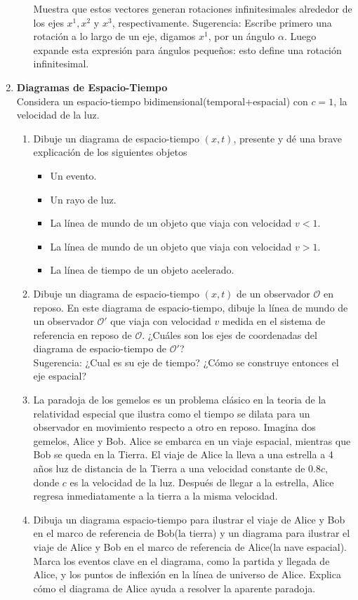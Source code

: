\documentclass[../main]{subfiles}
\begin{document}
\begin{enumerate}
\begin{enumerate}
        Muestra que estos vectores generan rotaciones infinitesimales alrededor de los ejes $x^1, x^2$ y $x^3$, respectivamente. Sugerencia: Escribe primero una rotación a lo largo de un eje, digamos $x^1$, por un ángulo $\alpha$. Luego expande esta expresión para ángulos pequeños: esto define una rotación infinitesimal.
    \end{enumerate}
    \item \textbf{Diagramas de Espacio-Tiempo}\\
    Considera un espacio-tiempo bidimensional(temporal+espacial) con $c=1$, la velocidad de la luz.
    \begin{enumerate}
        \item Dibuje un diagrama de espacio-tiempo $(x, t)$, presente y dé una brave explicación de los siguientes objetos
        \begin{itemize}
            \item Un evento.
            \item Un rayo de luz.
            \item La línea de mundo de un objeto que viaja con velocidad $v<1$.
            \item La línea de mundo de un objeto que viaja con velocidad $v>1$.
            \item La línea de tiempo de un objeto acelerado.
        \end{itemize}
        \item Dibuje un diagrama de espacio-tiempo $(x, t)$ de un observador $\mathcal{O}$ en reposo. En este diagrama de espacio-tiempo, dibuje la línea de mundo de un observador $\mathcal{O}'$ que viaja con velocidad $v$ medida en el sistema de referencia en reposo de $\mathcal{O}$. ¿Cuáles son los ejes de coordenadas del diagrama de espacio-tiempo de $\mathcal{O}'$?\\
        Sugerencia: ¿Cual es su eje de tiempo? ¿Cómo se construye entonces el eje espacial?
        \item La paradoja de los gemelos es un problema clásico en la teoria de la relatividad especial que ilustra como el tiempo se dilata para un observador en movimiento respecto a otro en reposo. Imagina dos gemelos, Alice y Bob. Alice se embarca en un viaje espacial, mientras que Bob se queda en la Tierra. El viaje de Alice la lleva a una estrella a 4 años luz de distancia de la Tierra a una velocidad constante de $0.8c$, donde $c$ es la velocidad de la luz. Después de llegar a la estrella, Alice regresa inmediatamente a la tierra a la misma velocidad.
        \item Dibuja un diagrama espacio-tiempo para ilustrar el viaje de Alice y Bob en el marco de referencia de Bob(la tierra) y un diagrama para ilustrar el viaje de Alice y Bob en el marco de referencia de Alice(la nave espacial). Marca los eventos clave en el diagrama, como la partida y llegada de Alice, y los puntos de inflexión en la línea de universo de Alice. Explica cómo el diagrama de Alice ayuda a resolver la aparente paradoja.

\end{enumerate}
\end{enumerate}
\end{document}
